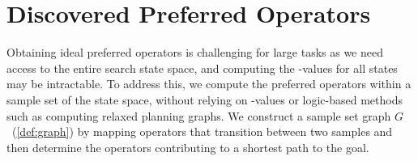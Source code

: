 \documentclass[ppgc,diss,english]{iiufrgs}
\begin{document}
%
%



\section{Discovered Preferred Operators}
\label{sec:sample-discovered-po}
Obtaining ideal preferred operators is challenging for large tasks as we need access to the entire search state space, and computing the \hstar-values for all states may be intractable. To address this, we compute the preferred operators within a sample set of the state space, without relying on \hstar-values or logic-based methods such as computing relaxed planning graphs. We construct a sample set graph $G$~(\vref{def:graph}) by mapping operators that transition between two samples and then determine the operators contributing to a shortest path to the goal.
\end{document}
